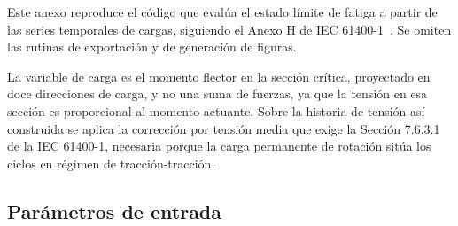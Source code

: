 
Este anexo reproduce el código que evalúa el estado límite de fatiga a partir de las series temporales de cargas, siguiendo el Anexo H de IEC 61400-1~\parencite*{IEC61400-1}. Se omiten las rutinas de exportación y de generación de figuras.

La variable de carga es el momento flector en la sección crítica, proyectado en doce direcciones de carga, y no una suma de fuerzas, ya que la tensión en esa sección es proporcional al momento actuante. Sobre la historia de tensión así construida se aplica la corrección por tensión media que exige la Sección 7.6.3.1 de la IEC 61400-1, necesaria porque la carga permanente de rotación sitúa los ciclos en régimen de tracción-tracción.

\subsection*{Parámetros de entrada}

